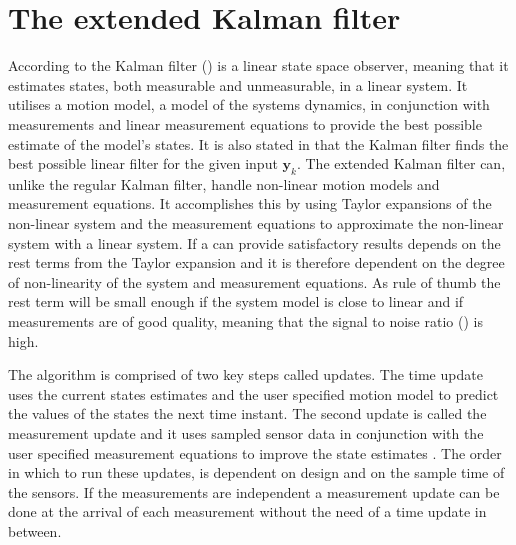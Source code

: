 \section{The extended Kalman filter}
According to \citet{sensorfusion} the Kalman filter (\abbrKF) is a linear state space observer, meaning that it estimates states, both measurable and unmeasurable, in a linear system. It utilises a motion model, a model of the systems dynamics, in conjunction with measurements and linear measurement equations to provide the best possible estimate of the model's states. It is also stated in \citet{sensorfusion} that the Kalman filter finds the best possible linear filter for the given input $\boldsymbol{y}_{k}$. The extended Kalman filter can, unlike the regular Kalman filter, handle non-linear motion models and measurement equations. It accomplishes this by using Taylor expansions of the non-linear system and the measurement equations to approximate the non-linear system with a linear system. If a \abbrEKF can provide satisfactory results depends on the rest terms from the Taylor expansion and it is therefore dependent on the degree of non-linearity of the system and measurement equations\citep{sensorfusion}. As rule of thumb the rest term will be small enough if the system model is close to linear and if measurements are of good quality, meaning that the signal to noise ratio (\abbrSNR) is high\citep{sensorfusion}. 

The \abbrEKF algorithm is comprised of two key steps called updates.
The time update uses the current states estimates and the user specified motion model to predict the values of the states the next time instant. The second update is called the measurement update and it uses sampled sensor data in conjunction with the user specified measurement equations to improve the state estimates \citep{sensorfusion}.
The order in which to run these updates, is dependent on design and on the sample time of the sensors. If the measurements are independent a measurement update can be done at the arrival of each measurement without the need of a time update in between\citep[p.170]{sensorfusion}.

